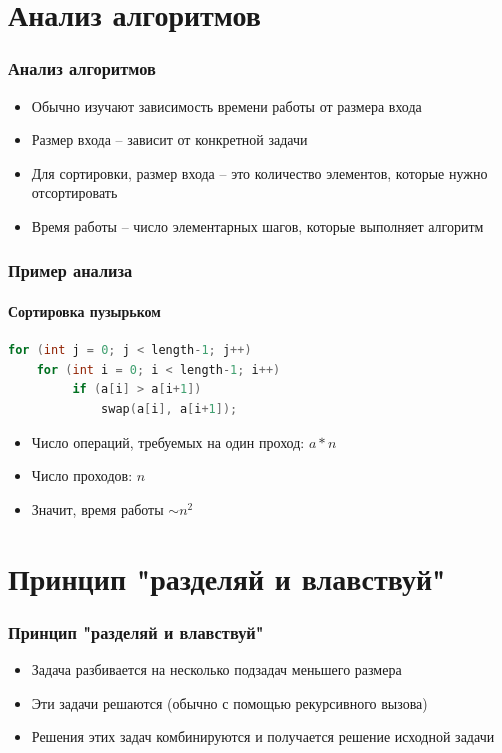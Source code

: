 \documentclass[12pt,pdf,hyperref={unicode}]{beamer}
\begin{document}
\section{Анализ алгоритмов}

\begin{frame}[fragile]
\frametitle{Анализ алгоритмов} 
\begin{itemize}
\item Обычно изучают зависимость времени работы от размера входа \\
\item Размер входа -- зависит от конкретной задачи \\
\item Для сортировки, размер входа -- это количество элементов, которые нужно отсортировать \\
\item Время работы -- число элементарных шагов, которые выполняет алгоритм
\end{itemize}
\end{frame}

\begin{frame}[fragile]
\frametitle{Пример анализа} 
\framesubtitle{Сортировка пузырьком}
\begin{lstlisting}[language=C++,basicstyle=\ttfamily,keywordstyle=\color{blue}]
for (int j = 0; j < length-1; j++)
    for (int i = 0; i < length-1; i++)
         if (a[i] > a[i+1])
             swap(a[i], a[i+1]);
\end{lstlisting}
\begin{itemize}
\item Число операций, требуемых на один проход: $a * n$\\
\item Число проходов: $n$\\
\item Значит, время работы $\sim n^2$\\
\end{itemize}

\end{frame}


\section{Принцип "разделяй и влавствуй"}

\begin{frame}[fragile]
\frametitle{Принцип "разделяй и влавствуй"} 
\begin{itemize}
\item Задача разбивается на несколько подзадач меньшего размера \\
\item Эти задачи решаются (обычно с помощью рекурсивного вызова) \\
\item Решения этих задач комбинируются и получается решение исходной задачи \\
\end{itemize}
\end{frame}
\end{document}
